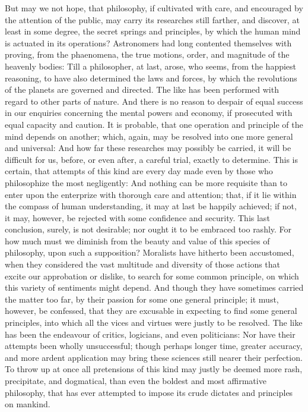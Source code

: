 \documentclass[]{article}
\begin{document}
\begin{sectionbody}
\humeparagraph  But may we not hope, that philosophy, if cultivated with care, and encouraged by the attention of the public, may carry its researches still farther, and discover, at least in some degree, the secret springs and principles, by which the human mind is actuated in its operations? Astronomers had long contented themselves with proving, from the phaenomena, the true motions, order, and magnitude of the heavenly bodies: Till a philosopher, at last, arose, who seems, from the happiest reasoning, to have also determined the laws and forces, by which the revolutions of the planets are governed and directed. The like has been performed with regard to other parts of nature. And there is no reason to despair of equal success in our enquiries concerning the mental powers and economy, if prosecuted with equal capacity and caution. It is probable, that one operation and principle of the mind depends on another; which, again, may be resolved into one more general and universal: And how far these researches may possibly be carried, it will be difficult for us, before, or even after, a careful trial, exactly to determine. This is certain, that attempts of this kind are every day made even by those who philosophize the most negligently: And nothing can be more requisite than to enter upon the enterprize with thorough care and attention; that, if it lie within the compass of human understanding, it may at last be happily achieved; if not, it may, however, be rejected with some confidence and security. This last conclusion, surely, is not desirable; nor ought it to be embraced too rashly. For how much must we diminish from the beauty and value of this species of philosophy, upon such a supposition? Moralists have hitherto been accustomed, when they considered the vast multitude and diversity of those actions that excite our approbation or dislike, to search for some common principle, on which this variety of sentiments might depend. And though they have sometimes carried the matter too far, by their passion for some one general principle; it must, however, be confessed, that they are excusable in expecting to find some general principles, into which all the vices and virtues were justly to be resolved. The like has been the endeavour of critics, logicians, and even politicians: Nor have their attempts been wholly unsuccessful; though perhaps longer time, greater accuracy, and more ardent application may bring these sciences still nearer their perfection. To throw up at once all pretensions of this kind may justly be deemed more rash, precipitate, and dogmatical, than even the boldest and most affirmative philosophy, that has ever attempted to impose its crude dictates and principles on mankind.


\end{sectionbody}
\end{document}
